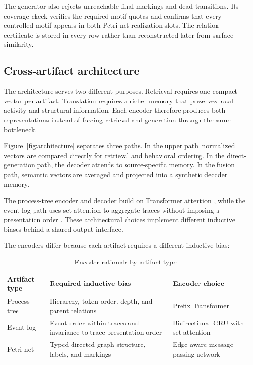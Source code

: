 \documentclass[pdflatex,sn-basic]{sn-jnl}
\begin{document}
The generator also rejects unreachable final markings and dead transitions. Its coverage check verifies the required motif quotas and confirms that every controlled motif appears in both Petri-net realization slots. The relation certificate is stored in every row rather than reconstructed later from surface similarity.

\subsection{Cross-artifact architecture}\label{sec:architecture}

The architecture serves two different purposes. Retrieval requires one compact vector per artifact. Translation requires a richer memory that preserves local activity and structural information. Each encoder therefore produces both representations instead of forcing retrieval and generation through the same bottleneck.

Figure~\ref{fig:architecture} separates three paths. In the upper path, normalized vectors are compared directly for retrieval and behavioral ordering. In the direct-generation path, the decoder attends to source-specific memory. In the fusion path, semantic vectors are averaged and projected into a synthetic decoder memory.



The process-tree encoder and decoder build on Transformer attention \citep{Vaswani2017}, while the event-log path uses set attention to aggregate traces without imposing a presentation order \citep{Lee2019}. These architectural choices implement different inductive biases behind a shared output interface.

The encoders differ because each artifact requires a different inductive bias:

\begin{table}[!t]
\centering
\caption{Encoder rationale by artifact type.}
\label{tab:encoders}
\begin{tabularx}{\textwidth}{@{}L{0.18\textwidth}YL{0.27\textwidth}@{}}
\toprule
Artifact type & Required inductive bias & Encoder choice \\
\midrule
Process tree & Hierarchy, token order, depth, and parent relations & Prefix Transformer \\
Event log & Event order within traces and invariance to trace presentation order & Bidirectional GRU with set attention \\
Petri net & Typed directed graph structure, labels, and markings & Edge-aware message-passing network \\
\bottomrule
\end{tabularx}
\end{table}
\end{document}
